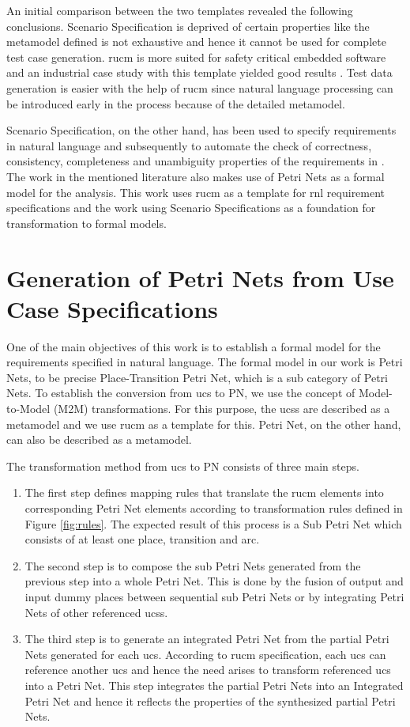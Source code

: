 An initial comparison between the two templates revealed the following conclusions. Scenario Specification is deprived of certain properties like the metamodel defined is not exhaustive and hence it cannot be used for complete test case generation. \gls{rucm} is more suited for safety critical embedded software and an industrial case study with this template yielded good results \cite{wang2015umtg}. Test data generation is easier with the help of \gls{rucm} since natural language processing can be introduced early in the process because of the detailed metamodel. 

Scenario Specification, on the other hand, has been used to specify requirements in natural language and subsequently to automate the check of correctness, consistency, completeness and unambiguity properties of the requirements in \cite{calisaya2016analysis}. The work in the mentioned literature also makes use of Petri Nets as a formal model for the analysis. This work uses \gls{rucm} as a template for \gls{rnl} requirement specifications and the work using Scenario Specifications as a foundation for transformation to formal models. 


\section{Generation of Petri Nets from Use Case Specifications}
One of the main objectives of this work is to establish a formal model for the requirements specified in natural language. The formal model in our work is Petri Nets, to be precise Place-Transition Petri Net, which is a sub category of Petri Nets. To establish the conversion from \gls{ucs} to PN, we use the concept of Model-to-Model (M2M) transformations. For this purpose, the \glspl{ucs} are described as a metamodel and we use \gls{rucm} as a template for this. Petri Net, on the other hand, can also be described as a metamodel.

The transformation method from \gls{ucs} to PN consists of three main steps.

\begin{enumerate}
\item The first step defines mapping rules that translate the \gls{rucm} elements into corresponding Petri Net elements according to transformation rules defined in Figure \ref{fig:rules}. The expected result of this process is a Sub Petri Net which consists of at least one place, transition and arc.
\item The second step is to compose the sub Petri Nets generated from the previous step into a whole Petri Net. This is done by the fusion of output and input dummy places between sequential sub Petri Nets or by integrating Petri Nets of other referenced \glspl{ucs}.
\item The third step is to generate an integrated Petri Net from the partial Petri Nets generated for each \gls{ucs}. According to \gls{rucm} specification, each \gls{ucs} can reference another \gls{ucs} and hence the need arises to transform referenced \gls{ucs} into a Petri Net. This step integrates the partial Petri Nets into an Integrated Petri Net and hence it reflects the properties of the synthesized partial Petri Nets.
\end{enumerate}

